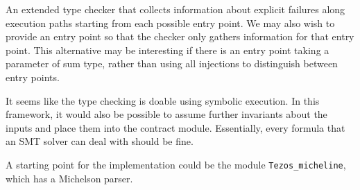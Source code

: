 \documentclass[a4paper]{llncs}
\begin{document}
An extended type checker that collects information about explicit failures along execution paths
starting from each possible entry point. We may also wish to provide an entry point so that the
checker only gathers information for that entry point. This alternative may be interesting if there
is an entry point taking a parameter of sum type, rather than using all injections to distinguish
between entry points.

It seems like the type checking is doable using symbolic execution. In this framework, it would also
be possible to assume further invariants about the inputs and place them into the contract
module. Essentially, every formula that an SMT solver can deal with should be fine.

A starting point for the implementation could be the module \lstinline/Tezos_micheline/, which has a
Michelson parser. 
\end{document}
